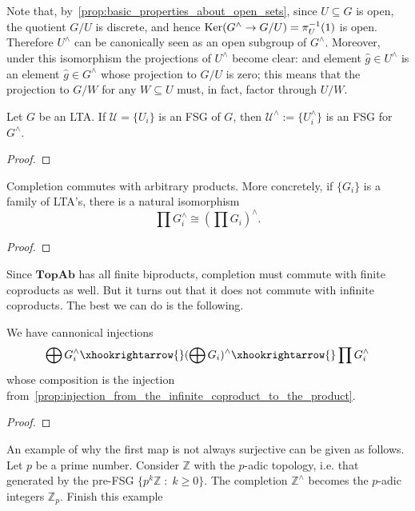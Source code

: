\begin{remark} Note that, by~\cref{prop:basic_properties_about_open_sets}, since $U \subseteq G$ is open, the quotient $G/U$ is discrete, and hence ${\rm Ker}(G^\land \rightarrow G/U) = \pi_U^{-1}(1)$ is open. Therefore $U^\land$ can be canonically seen as an open subgroup of $G^\land$. Moreover, under this isomorphism the projections of $U^\land$ become clear: and element $\widehat{g} \in U^\land$ is an element $\widehat{g} \in G^\land$ whose projection to $G/U$ is zero; this means that the projection to $G/W$ for any $W \subseteq U$ must, in fact, factor through $U/W$.
\end{remark}

\begin{proposition} Let $G$ be an LTA. If $\mathcal{U} = \{U_i\}$ is an FSG of $G$, then $\mathcal{U}^\land := \{U_i^\land\}$ is an FSG for $G^\land$.
\end{proposition}
\begin{proof} \TODO
\end{proof}

\begin{proposition} Completion commutes with arbitrary products. More concretely, if $\{G_i\}$ is a family of LTA's, there is a natural isomorphism $$\prod G_i^\land \cong ( \prod G_i )^\land.$$
\end{proposition}
\begin{proof} \TODO
\end{proof}

\noindent Since $\textbf{TopAb}$ has all finite biproducts, completion must commute with finite coproducts as well. But it turns out that it does not commute with infinite coproducts. The best we can do is the following.

\begin{proposition} We have cannonical injections
\[\bigoplus G_i^\land \xhookrightarrow{} (\bigoplus G_i)^\land \xhookrightarrow{} \prod G_i^\land\]
whose composition is the injection from~\cref{prop:injection_from_the_infinite_coproduct_to_the_product}.
\end{proposition}
\begin{proof} \TODO
\end{proof}

\begin{remark} An example of why the first map is not always surjective can be given as follows. Let $p$ be a prime number. Consider $\mathbb{Z}$ with the $p$-adic topology, i.e. that generated by the pre-FSG $\{p^k \mathbb{Z} \;:\; k \geq 0\}$. The completion $\mathbb{Z}^\land$ becomes the $p$-adic integers $\mathbb{Z}_p$. \TODO Finish this example
\end{remark}

